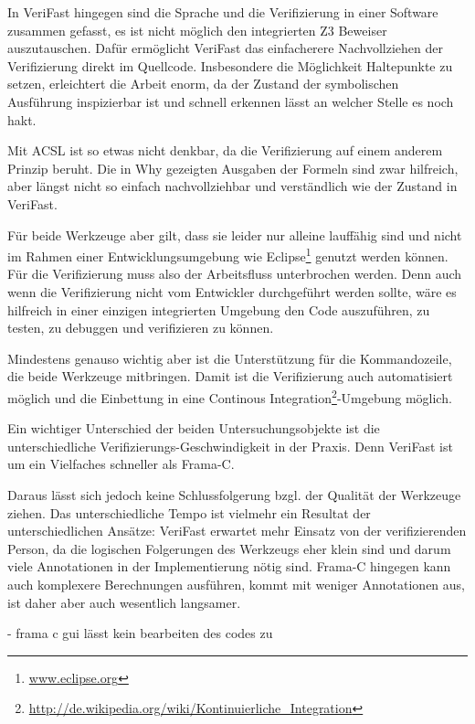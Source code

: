 In VeriFast hingegen sind die Sprache und die Verifizierung in einer Software zusammen gefasst,
es ist nicht möglich den integrierten Z3 Beweiser auszutauschen. Dafür ermöglicht VeriFast das
einfacherere Nachvollziehen der Verifizierung direkt im Quellcode. Insbesondere die Möglichkeit
Haltepunkte zu setzen, erleichtert die Arbeit enorm, da der Zustand der symbolischen Ausführung
inspizierbar ist und schnell erkennen lässt an welcher Stelle es noch hakt.

Mit ACSL ist so etwas nicht denkbar, da die Verifizierung auf einem anderem Prinzip beruht. Die
in Why gezeigten Ausgaben der Formeln sind zwar hilfreich, aber längst nicht so einfach nachvollziehbar und
verständlich wie der Zustand in VeriFast.

Für beide Werkzeuge aber gilt, dass sie leider nur alleine lauffähig sind und nicht im Rahmen
einer Entwicklungsumgebung wie Eclipse\footnote{\url{www.eclipse.org}} genutzt werden können. 
Für die Verifizierung muss also der Arbeitsfluss unterbrochen werden. Denn auch wenn die Verifizierung
nicht vom Entwickler durchgeführt werden sollte, wäre es hilfreich in einer einzigen integrierten Umgebung
den Code auszuführen, zu testen, zu debuggen und verifizieren zu können.

Mindestens genauso wichtig aber ist die Unterstützung für die Kommandozeile, die beide Werkzeuge
mitbringen. Damit ist die Verifizierung auch automatisiert möglich und die Einbettung in eine
Continous Integration\footnote{\url{http://de.wikipedia.org/wiki/Kontinuierliche_Integration}}-Umgebung möglich.

Ein wichtiger Unterschied der beiden Untersuchungsobjekte ist die unterschiedliche Verifizierungs-Geschwindigkeit
in der Praxis. Denn VeriFast ist um ein Vielfaches schneller\cite[Kap. 3]{jac10-1} als Frama-C. 

Daraus lässt sich jedoch keine Schlussfolgerung bzgl. der Qualität der Werkzeuge ziehen. Das unterschiedliche Tempo ist 
vielmehr ein Resultat der unterschiedlichen Ansätze: VeriFast erwartet mehr Einsatz von der verifizierenden Person, da
die logischen Folgerungen des Werkzeugs eher klein sind und darum viele Annotationen in der Implementierung nötig sind.
Frama-C hingegen kann auch komplexere Berechnungen ausführen, kommt mit weniger Annotationen aus, ist daher aber auch
wesentlich langsamer.

- frama c gui lässt kein bearbeiten des codes zu

